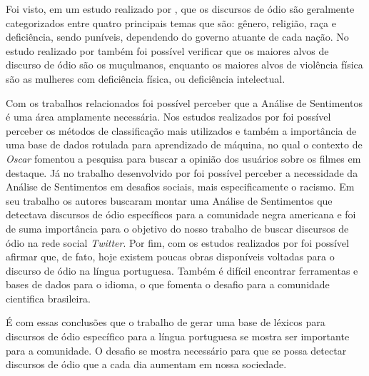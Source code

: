 Foi visto, em um estudo realizado por , que os discursos de ódio são geralmente categorizados entre quatro principais temas que são: gênero, religião, raça e deficiência, sendo puníveis, dependendo do governo atuante de cada nação. No estudo realizado por  também foi possível verificar que os maiores alvos de discurso de ódio são os muçulmanos, enquanto os maiores alvos de violência física são as mulheres com deficiência física, ou deficiência intelectual.

Com os trabalhos relacionados foi possível perceber que a Análise de Sentimentos é uma área amplamente necessária. Nos estudos realizados por  foi possível perceber os métodos de classificação mais utilizados e também a importância de uma base de dados rotulada para aprendizado de máquina, no qual o contexto de \textit{Oscar} fomentou a pesquisa para buscar a opinião dos usuários sobre os filmes em destaque. Já no trabalho desenvolvido por  foi possível perceber a necessidade da Análise de Sentimentos em desafios sociais, mais especificamente o racismo. Em seu trabalho os autores buscaram montar uma Análise de Sentimentos que detectava discursos de ódio específicos para a comunidade negra americana e foi de suma importância para o objetivo do nosso trabalho de buscar discursos de ódio na rede social \textit{Twitter}. Por fim, com os estudos realizados por  foi possível afirmar que, de fato, hoje existem poucas obras disponíveis voltadas para o discurso de ódio na língua portuguesa. Também é difícil encontrar ferramentas e bases de dados para o idioma, o que fomenta o desafio para a comunidade cientifica brasileira.

É com essas conclusões que o trabalho de gerar uma base de léxicos para discursos de ódio específico para a língua portuguesa se mostra ser importante para a comunidade. O desafio se mostra necessário para que se possa detectar discursos de ódio que a cada dia aumentam em nossa sociedade.